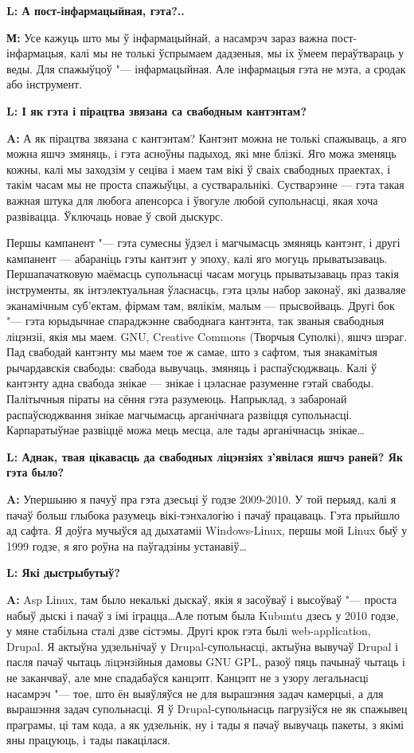 \documentclass[10pt, a5paper]{article}
\begin{document}
{\noindent \bf L: А пост-інфармацыйная, гэта?..}

{\noindent \bf М:}  Усе кажуць што мы ў інфармацыйнай, а насамрэч зараз важна пост-інфармацыя, калі мы не толькі ўспрымаем дадзеныя, мы іх ўмеем пераўтвараць у веды. Для спажыўцоў "--- інфармацыйная. Але iнфармацыя гэта не мэта, а сродак або інструмент.

{\noindent \bf L: І як гэта і пірацтва звязана са свабодным кантэнтам?}

{\noindent \bf A:} А як пірацтва звязана с кантэнтам? Кантэнт можна не толькі спажываць, а яго можна яшчэ змяняць, i гэта асноўны падыход, які мне блізкі. Яго можа зменяць кожны, калі мы заходзім у сеціва і маем там вікі ў сваіх свабодных праектах, і такім часам мы не проста спажыўцы, а сустваральнікі. Сустварэнне — гэта такая важная штука для любога апенсорса і ўвогуле любой супольнасці, якая хоча развівацца. Ўключаць новае ў свой дыскурс.

Першы кампанент "--- гэта сумесны ўдзел і магчымасць змяняць кантэнт, і другі кампанент — абараніць гэты кантэнт у эпоху, калі яго могуць прыватызаваць. Першапачатковую маёмасць супольнасці часам могуць прыватызаваць праз такія інструменты, як інтэлектуальная ўласнасць, гэта цэлы набор законаў, які дазваляе эканамічным суб'ектам, фірмам там, вялікім, малым — прысвойваць. Другі бок "--- гэта юрыдычнае спараджэнне свабоднага кантэнта, так званыя свабодныя ліцэнзіі, якія мы маем. GNU, Creative Commons (Творчыя Суполкі), яшчэ шэраг. Пад свабодай кантэнту мы маем тое ж самае, што з сафтом, тыя знакамітыя рычардавскія свабоды: свабода вывучаць, змяняць і распаўсюджваць. Калі ў кантэнту адна свабода знікае — знікае і цэласнае разуменне гэтай свабоды. Палітычныя піраты на сёння гэта разумеюць. Напрыклад, з забаронай распаўсюджвання знікае магчымасць арганічнага развіцця супольнасці. Карпаратыўнае развіццё можа мець месца, але тады арганічнасць знікае\ldots


{\noindent \bf L: Аднак, твая цікавасць да свабодных ліцэнзіях з'явілася яшчэ раней? Як гэта было?}

{\noindent \bf A:} Упершыню я пачуў пра гэта дзесьці ў годзе 2009-2010. У той перыяд, калі я пачаў больш глыбока разумець вікі-тэнхалогію і пачаў працаваць. Гэта прыйшло ад сафта. Я доўга мучыўся ад дыхатаміі Wіndows-Lіnux, першы мой Lіnux быў у 1999 годзе, я яго роўна на паўгадзіны устанавіў\ldots

{\noindent \bf L: Які дыстрыбутыў?}

{\noindent \bf A:} Asp Lіnux, там было некалькі дыскаў, якія я засоўваў і высоўваў "--- проста набыў дыскі і пачаў з імі іграцца\ldots Але потым была Kubuntu дзесь у 2010 годзе, у мяне стабільна сталі дзве сістэмы. Другі крок гэта былi web-applіcatіon, Drupal. Я актыўна удзельнічаў у Drupal-супольнасці, актыўна вывучаў Drupal і пасля пачаў чытаць лiцэнзiйныя дамовы GNU GPL, разоў пяць пачынаў чытаць і не заканчваў, але мне спадабаўся канцэпт. Канцэпт не з узору легальнасцi насамрэч "--- тое, што ён выяўляўся не для вырашэння задач камерцыі, а для вырашэння задач супольнасці. Я ў Drupal-супольнасць пагрузіўся не як спажывец праграмы, ці там кода, а як удзельнік, ну і тады я пачаў вывучаць пакеты, з якімі яны працуюць, і тады пакацілася. 
\end{document}
